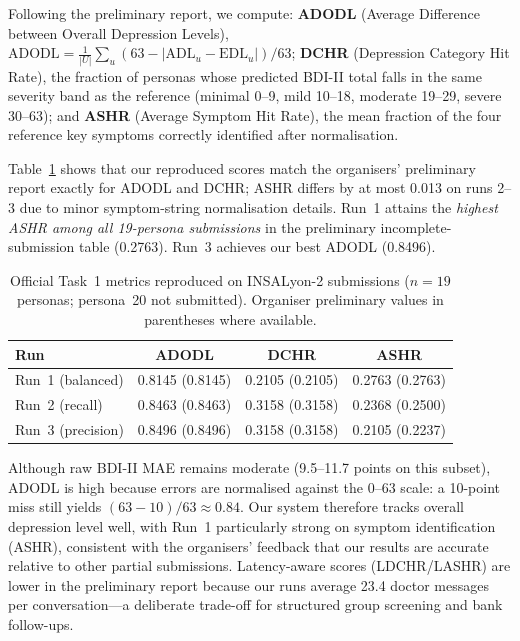 \documentclass[]{ceurart}
\begin{document}
Following the preliminary report, we compute:
\textbf{ADODL} (Average Difference between Overall Depression Levels), $\mathrm{ADODL} = \frac{1}{|U|}\sum_u (63 - |\mathrm{ADL}_u - \mathrm{EDL}_u|)/63$;
\textbf{DCHR} (Depression Category Hit Rate), the fraction of personas whose predicted BDI-II total falls in the same severity band as the reference (minimal 0--9, mild 10--18, moderate 19--29, severe 30--63);
and \textbf{ASHR} (Average Symptom Hit Rate), the mean fraction of the four reference key symptoms correctly identified after normalisation.

Table~\ref{tab:gt} shows that our reproduced scores match the organisers' preliminary report exactly for ADODL and DCHR; ASHR differs by at most 0.013 on runs 2--3 due to minor symptom-string normalisation details.
Run~1 attains the \emph{highest ASHR among all 19-persona submissions} in the preliminary incomplete-submission table (0.2763).
Run~3 achieves our best ADODL (0.8496).

\begin{table}[t]
\caption{Official Task~1 metrics reproduced on INSALyon-2 submissions ($n = 19$ personas; persona~20 not submitted). Organiser preliminary values in parentheses where available.}
\label{tab:gt}
\centering
\small
\begin{tabular}{lccc}
\toprule
\textbf{Run} & \textbf{ADODL} & \textbf{DCHR} & \textbf{ASHR} \\
\midrule
Run~1 (balanced)   & 0.8145 (0.8145) & 0.2105 (0.2105) & 0.2763 (0.2763) \\
Run~2 (recall)     & 0.8463 (0.8463) & 0.3158 (0.3158) & 0.2368 (0.2500) \\
Run~3 (precision)  & 0.8496 (0.8496) & 0.3158 (0.3158) & 0.2105 (0.2237) \\
\bottomrule
\end{tabular}
\end{table}

Although raw BDI-II MAE remains moderate (9.5--11.7 points on this subset), ADODL is high because errors are normalised against the 0--63 scale: a 10-point miss still yields $(63-10)/63 \approx 0.84$.
Our system therefore tracks overall depression level well, with Run~1 particularly strong on symptom identification (ASHR), consistent with the organisers' feedback that our results are accurate relative to other partial submissions.
Latency-aware scores (LDCHR/LASHR) are lower in the preliminary report because our runs average 23.4 doctor messages per conversation---a deliberate trade-off for structured group screening and bank follow-ups.
\end{document}
